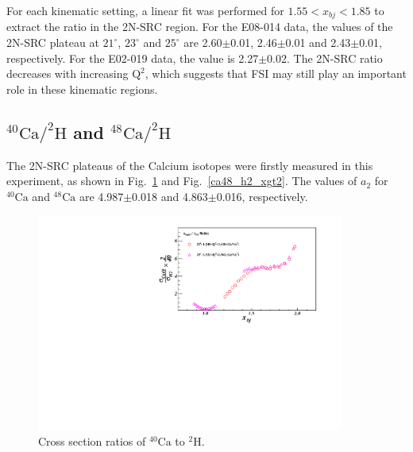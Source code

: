  For each kinematic setting, a linear fit was performed for $1.55<x_{bj}<1.85$ to extract the ratio in the 2N-SRC region. For the E08-014 data, the values of the 2N-SRC plateau at $21^{\circ}$, $23^{\circ}$ and $25^{\circ}$  are 2.60$\pm$0.01, 2.46$\pm$0.01 and 2.43$\pm$0.01, respectively. For the E02-019 data, the value is 2.27$\pm$0.02. The 2N-SRC ratio decreases with increasing $\mathrm{Q^{2}}$, which suggests that FSI may still play an important role in these kinematic regions. 

\subsection{$\mathrm{^{40}Ca/^{2}H}$ and $\mathrm{^{48}Ca/^{2}H}$}
The 2N-SRC plateaus of the Calcium isotopes were firstly measured in this experiment, as shown in Fig.~\ref{ca40_h2_xgt2} and Fig.~\ref{ca48_h2_xgt2}. The values of $a_{2}$ for $\mathrm{^{40}Ca}$ and $\mathrm{^{48}Ca}$ are 4.987$\pm$0.018 and 4.863$\pm$0.016, respectively.  
 \begin{figure}[!ht]
  \begin{center}
    \includegraphics[type=pdf,ext=.pdf,read=.pdf,width=0.9\textwidth]{./figures/xs/Ca40_H2_XS_Ratio}
   \caption[Cross section ratios of $\mathrm{^{40}Ca}$ to $\mathrm{^{2}H}$]{\footnotesize{Cross section ratios of $\mathrm{^{40}Ca}$ to $\mathrm{^{2}H}$.}}
    \label{ca40_h2_xgt2}
  \end{center}
\end{figure}
